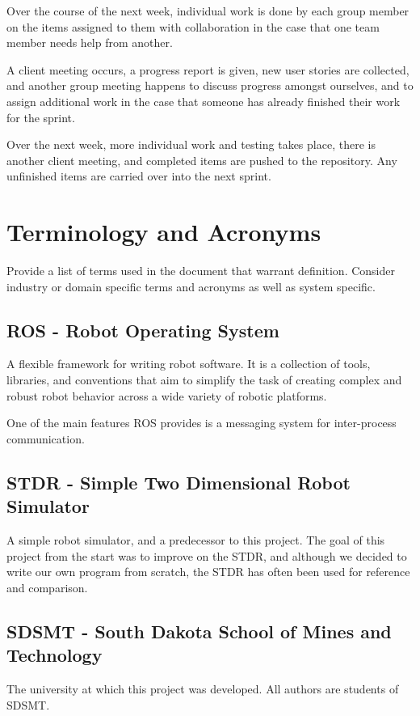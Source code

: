 Over the course of the next week, individual work is done by each group member on the items assigned to them with collaboration in the case that one team member needs help from another.

A client meeting occurs, a progress report is given, new user stories are collected, and another group meeting happens to discuss progress amongst ourselves, and to assign additional work in the case that someone has already finished their work for the sprint.

Over the next week, more individual work and testing takes place, there is another client meeting, and completed items are pushed to the repository. Any unfinished items are carried over into the next sprint.

\section{Terminology and Acronyms}
Provide a list of terms used in the document that warrant definition.  Consider 
industry or domain specific terms and acronyms as well as system specific. 

\subsection{ROS - Robot Operating System}
A flexible framework for writing robot software. It is a collection of tools, libraries, and conventions that aim to simplify the task of creating complex and robust robot behavior across a wide variety of robotic platforms.

One of the main features ROS provides is a messaging system for inter-process communication.

\subsection{STDR - Simple Two Dimensional Robot Simulator}
A simple robot simulator, and a predecessor to this project. The goal of this project from the start was to improve on the STDR, and although we decided to write our own program from scratch, the STDR has often been used for reference and comparison.

\subsection{SDSMT - South Dakota School of Mines and Technology}
The university at which this project was developed. All authors are students of SDSMT.

